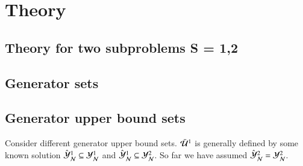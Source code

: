 \section{Theory}

\subsection{Theory for two subproblems S = {1,2}}

\subsection{Generator sets}
	
\subsection{Generator upper bound sets}
Consider different generator upper bound sets. $\bar{\mathcal{U}}^{1}$ is generally defined by some known solution $\hat{\mathcal{Y}}_\mathcal{N}^1 \subseteq \mathcal{Y}_{\mathcal{N}}^1$ and  $\hat{\mathcal{Y}}_\mathcal{N}^1 \subseteq \mathcal{Y}_{\mathcal{N}}^2$. So far we have assumed $\hat{\mathcal{Y}}_\mathcal{N}^2 = \mathcal{Y}_{\mathcal{N}}^2$.

